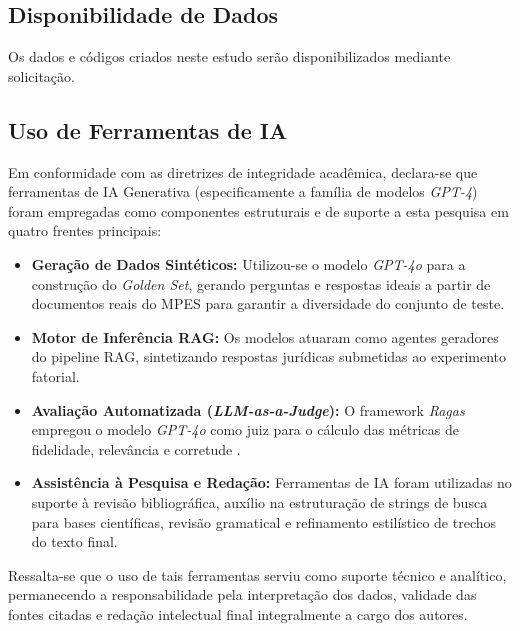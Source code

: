 \documentclass[a4paper, 10pt]{article}
\begin{document}
\subsection*{Disponibilidade de Dados}
Os dados e códigos criados neste estudo serão disponibilizados mediante solicitação.

\subsection*{Uso de Ferramentas de IA}
Em conformidade com as diretrizes de integridade acadêmica, declara-se que ferramentas de IA Generativa (especificamente a família de modelos \textit{GPT-4}) foram empregadas como componentes estruturais e de suporte a esta pesquisa em quatro frentes principais:

\begin{itemize}
  \item \textbf{Geração de Dados Sintéticos:} Utilizou-se o modelo \textit{GPT-4o} para a construção do \textit{Golden Set}, gerando perguntas e respostas ideais a partir de documentos reais do MPES para garantir a diversidade do conjunto de teste.
  \item \textbf{Motor de Inferência RAG:} Os modelos atuaram como agentes geradores do pipeline RAG, sintetizando respostas jurídicas submetidas ao experimento fatorial.
  \item \textbf{Avaliação Automatizada (\textit{LLM-as-a-Judge}):} O framework \textit{Ragas} empregou o modelo \textit{GPT-4o} como juiz para o cálculo das métricas de fidelidade, relevância e corretude \citep{es2023}.
  \item \textbf{Assistência à Pesquisa e Redação:} Ferramentas de IA foram utilizadas no suporte à revisão bibliográfica, auxílio na estruturação de strings de busca para bases científicas, revisão gramatical e refinamento estilístico de trechos do texto final.
\end{itemize}

Ressalta-se que o uso de tais ferramentas serviu como suporte técnico e analítico, permanecendo a responsabilidade pela interpretação dos dados, validade das fontes citadas e redação intelectual final integralmente a cargo dos autores.




\clearpage
\onecolumn

\end{document}

